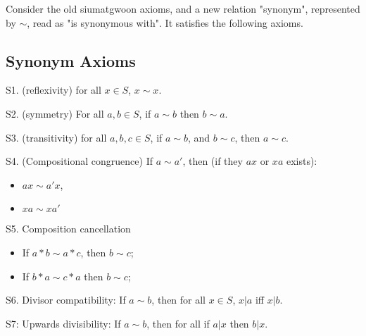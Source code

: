 Consider the old siumatgwoon axioms, and a new relation "synonym", represented by $\sim$, read as "is synonymous with". It satisfies the following axioms.

\subsection{Synonym Axioms}

\begin{axiom}[Reflexivity]\label{ax:syn-reflex}
S1. (reflexivity) for all $x\in S$, $x\sim x$.
\end{axiom}

\begin{axiom}[Symmetry]\label{ax:syn-sym}
S2. (symmetry) For all $a,b\in S$, if $a\sim b$ then $b\sim a$.
\end{axiom}

\begin{axiom}[Transitivity]\label{ax:syn-trans}
S3. (transitivity) for all $a,b,c \in S$, if $a\sim b$, and $b \sim c$, then $a \sim c$.
\end{axiom}

\begin{axiom}\label{ax:syn-comp}
S4. (Compositional congruence) If $a \sim a'$, then (if they $ax$ or $xa$ exists):
\begin{itemize}
\item $ax \sim a'x$,
\item $xa \sim xa'$
\end{itemize}
\end{axiom}

\begin{axiom}\label{ax:syn-cancel}
S5. Composition cancellation
\begin{itemize}
\item If $a * b \sim a * c$, then $b \sim c$;
\item If $b*a\sim c*a$ then $b \sim c$;
\end{itemize}
\end{axiom}

\begin{axiom}\label{ax:syn-div}
S6. Divisor compatibility: If $a \sim b$, then for all $x \in S$, $x|a$ iff $x|b$.
\end{axiom}

\begin{axiom}\label{ax:syn-up}
S7: Upwards divisibility: If $a\sim b$, then for all if $a|x$ then $b|x$.
\end{axiom}

